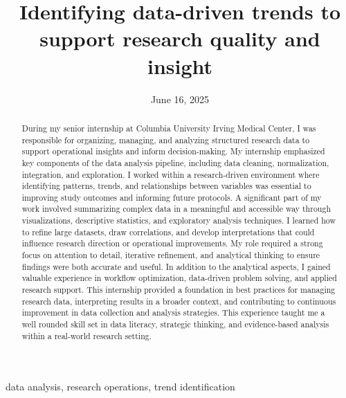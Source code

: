﻿\documentclass[12pt,conference,onecolumn]{IEEEtran}
\title{Identifying data-driven trends to support research quality and insight}
\author{%
\IEEEauthorblockN{Nathan Gershteyn}\IEEEauthorblockA{Science \& Engineering\\Manalapan High School\\Englishtown, NJ\\425ngershteyn@frhsd.com}}
\date{June 16, 2025}
\newcommand{\keywords}{data analysis, research operations, trend identification}
\begin{document}
\maketitle 

\begin{abstract}
During my senior internship at Columbia University Irving Medical Center, I was responsible for organizing, managing, and analyzing structured research data to support operational insights and inform decision-making. My internship emphasized key components of the data analysis pipeline, including data cleaning, normalization, integration, and exploration. I worked within a research-driven environment where identifying patterns, trends, and relationships between variables was essential to improving study outcomes and informing future protocols. A significant part of my work involved summarizing complex data in a meaningful and accessible way through visualizations, descriptive statistics, and exploratory analysis techniques. I learned how to refine large datasets, draw correlations, and develop interpretations that could influence research direction or operational improvements. My role required a strong focus on attention to detail, iterative refinement, and analytical thinking to ensure findings were both accurate and useful. In addition to the analytical aspects, I gained valuable experience in workflow optimization, data-driven problem solving, and applied research support. This internship provided a foundation in best practices for managing research data, interpreting results in a broader context, and contributing to continuous improvement in data collection and analysis strategies. This experience taught me a well rounded skill set in data literacy, strategic thinking, and evidence-based analysis within a real-world research setting.
\end{abstract}

\begin{IEEEkeywords}
\keywords
\end{IEEEkeywords}
\end{document}
